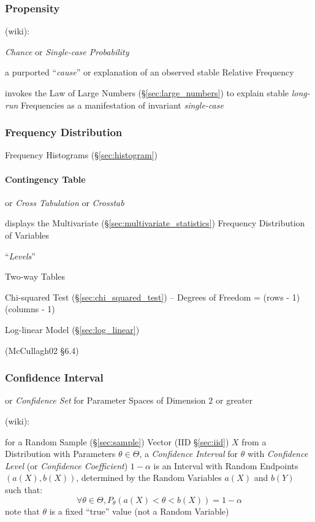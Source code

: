 \subsubsection{Propensity}\label{sec:propensity}

(wiki):

\emph{Chance} or \emph{Single-case Probability}

a purported ``\emph{cause}'' or explanation of an observed stable Relative
Frequency

invokes the Law of Large Numbers (\S\ref{sec:large_numbers}) to explain stable
\emph{long-run} Frequencies as a manifestation of invariant \emph{single-case}



\subsubsection{Frequency Distribution}\label{sec:frequency_distribution}

Frequency Histograms (\S\ref{sec:histogram})



\paragraph{Contingency Table}\label{sec:contingency_table}\hfill

or \emph{Cross Tabulation} or \emph{Crosstab}

displays the Multivariate (\S\ref{sec:multivariate_statistics}) Frequency
Distribution of Variables

``\emph{Levels}''

Two-way Tables

Chi-squared Test (\S\ref{sec:chi_squared_test}) -- Degrees of Freedom =
(rows - 1)(columns - 1)

Log-linear Model (\S\ref{sec:log_linear})

(McCullagh02 \S 6.4)



\subsubsection{Confidence Interval}\label{sec:confidence_interval}

or \emph{Confidence Set} for Parameter Spaces of Dimension $2$ or greater

(wiki):

for a Random Sample (\S\ref{sec:sample}) Vector (IID \S\ref{sec:iid}) $X$ from a
Distribution with Parameters $\theta \in \Theta$, a \emph{Confidence Interval}
for $\theta$ with \emph{Confidence Level} (or \emph{Confidence Coefficient}) $1
- \alpha$ is an Interval with Random Endpoints $(a(X), b(X))$, determined by the
Random Variables $a(X)$ and $b(Y)$ such that:
\[
  \forall \theta \in \Theta, P_\theta(a(X) < \theta < b(X)) = 1 - \alpha
\]
note that $\theta$ is a fixed ``true'' value (not a Random Variable)

